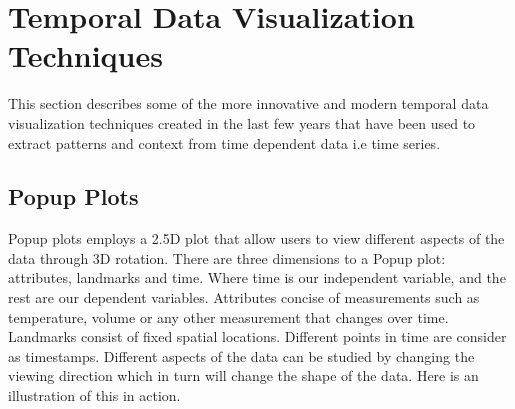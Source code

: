 \documentclass[twocolumn]{article}
\begin{document}
    \section{Temporal Data Visualization Techniques}
        This section describes some of the more innovative and modern temporal data visualization techniques created in the last few years that have been used to extract patterns and context from time dependent data i.e time series.
        
        \subsection{Popup Plots}
        
            Popup plots employs a 2.5D plot that allow users to
            view different aspects of the data through 3D rotation.
            There are three dimensions to a Popup plot: attributes, landmarks and time. Where time is our independent variable, and the rest are our dependent variables. Attributes concise of measurements such as temperature, volume or any other measurement that changes over time. Landmarks consist of fixed spatial locations. Different points in time are consider as timestamps. Different aspects of the data can be studied by changing the viewing direction which in turn will change the shape of the data\cite{popup-plots}. Here is an illustration of this in action\newline.
        
            \noindent
            \begin{minipage}{\linewidth}
            \end{minipage}
            
\end{document}
